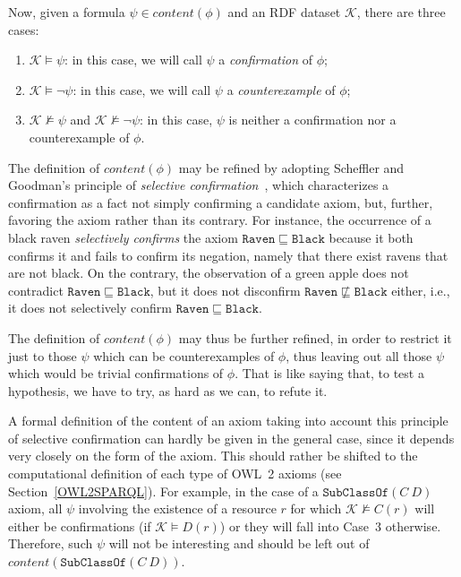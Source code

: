 \documentclass[review]{elsarticle}
\theoremstyle{definition}
\begin{document}
Now, given a formula $\psi \in content(\phi)$ and an RDF dataset $\mathcal{K}$,
there are three cases:
\begin{enumerate}
\item $\mathcal{K} \models \psi$:
  in this case, we will call $\psi$ a \emph{confirmation} of $\phi$;
\item $\mathcal{K} \models \neg\psi$:
  in this case, we will call $\psi$ a \emph{counterexample} of $\phi$;
\item $\mathcal{K} \not\models \psi$ and $\mathcal{K} \not\models \neg\psi$:
  in this case, $\psi$ is neither a confirmation nor a counterexample of $\phi$.
\end{enumerate}

The definition of $content(\phi)$ may be refined by adopting Scheffler and Goodman's principle of
\emph{selective confirmation}~\cite{SchefflerGoodman1972},
which characterizes a confirmation as a fact not simply confirming a candidate axiom, but, further,
favoring the axiom rather than its contrary.
For instance, the occurrence of a black raven \emph{selectively confirms} the axiom
$\mathtt{Raven} \sqsubseteq \mathtt{Black}$ because it both confirms it and fails to confirm its
negation, namely that there exist ravens that are not black. On the contrary, the observation of
a green apple does not contradict $\mathtt{Raven} \sqsubseteq \mathtt{Black}$,
but it does not disconfirm $\mathtt{Raven} \not\sqsubseteq \mathtt{Black}$
either, i.e., it does not selectively confirm $\mathtt{Raven} \sqsubseteq \mathtt{Black}$.

The definition of $content(\phi)$ may thus be further refined, in order to restrict it
just to those $\psi$ which can be counterexamples of $\phi$,
thus leaving out all those $\psi$ which would be trivial confirmations of $\phi$.
That is like saying that, to test a hypothesis, we have to try, as hard as we can,
to refute it. %

A formal definition of the content of an axiom taking into account this principle of selective confirmation can hardly be given in the general case, since it depends very closely on the form of the axiom. This should rather be shifted to the computational definition of each type of OWL~2 axioms (see Section~\ref{OWL2SPARQL}).
For example, in the case of a $\mathtt{SubClassOf}(C\ D)$ axiom,
all $\psi$ involving the existence of a resource $r$ for which $\mathcal{K} \not\models C(r)$
will either be confirmations (if $\mathcal{K} \models D(r)$) or they
will fall into Case~3 otherwise. Therefore, such $\psi$ will not be interesting
and should be left out of $content(\mathtt{SubClassOf}(C\ D))$.
\end{document}
